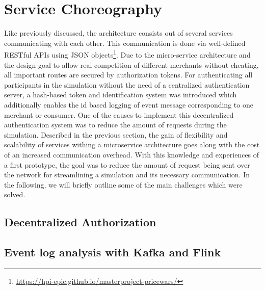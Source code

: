%
\section{Service Choreography}
\label{sec:Choreography}
%
Like previously discussed, the architecture consists out of several services communicating with each other. This communication is done via well-defined RESTful APIs using JSON objects\footnote{\url{https://hpi-epic.github.io/masterproject-pricewars/}}.  Due to the micro-service architecture and the design goal to allow real competition of different merchants without cheating, all important routes are secured by authorization tokens. For authenticating all participants in the simulation without the need of a centralized authentication server, a hash-based token and identification system was introduced which additionally enables the id based logging of event message corresponding to one merchant or consumer. One of the causes to implement this decentralized authentication system was to reduce the amount of requests during the simulation. Described in the previous section, the gain of flexibility and scalability of services withing a microservice architecture goes along with the cost of an increased communication overhead. With this knowledge and experiences of a first prototype, the goal was to reduce the amount of request being sent over the network for streamlining a simulation and its necessary communication. 
In the following, we will briefly outline some of the main challenges which were solved.

%
\subsection{Decentralized Authorization}
%

%
\subsection{Event log analysis with Kafka and Flink}
%


